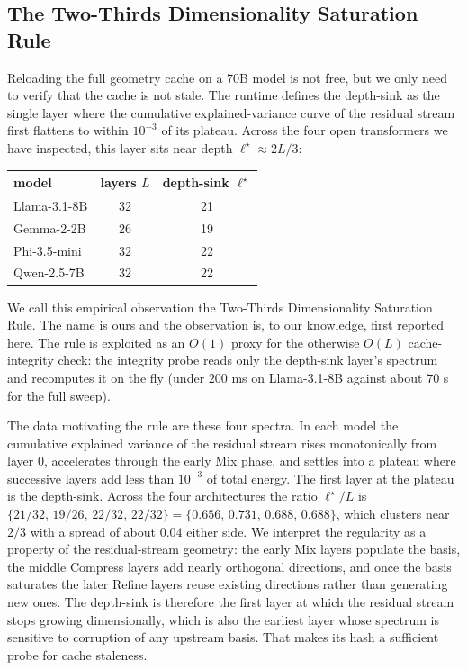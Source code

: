 \documentclass[11pt]{article}
\begin{document}
\subsection{The Two-Thirds Dimensionality Saturation Rule}
Reloading the full geometry cache on a 70B model is not free, but we
only need to verify that the cache is not stale. The runtime defines
the depth-sink as the single layer where the cumulative
explained-variance curve of the residual stream first flattens to
within $10^{-3}$ of its plateau. Across the four open transformers we
have inspected, this layer sits near depth $\ell^\star\approx 2L/3$:
\begin{center}\small
\begin{tabular}{lcc}\toprule
model & layers $L$ & depth-sink $\ell^\star$\\\midrule
Llama-3.1-8B   & 32 & 21\\
Gemma-2-2B     & 26 & 19\\
Phi-3.5-mini   & 32 & 22\\
Qwen-2.5-7B    & 32 & 22\\\bottomrule
\end{tabular}\end{center}
We call this empirical observation the Two-Thirds Dimensionality
Saturation Rule. The name is ours and the observation is, to our knowledge,
first reported here. The rule is exploited as an $O(1)$ proxy for the
otherwise $O(L)$ cache-integrity check: the integrity probe reads only the
depth-sink layer's spectrum and recomputes it on the fly (under $200$ ms on
Llama-3.1-8B against about $70$ s for the full sweep).

The data motivating the rule are these four spectra. In each model the
cumulative explained variance of the residual stream rises monotonically
from layer $0$, accelerates through the early Mix phase, and settles
into a plateau where successive layers add less than $10^{-3}$ of
total energy. The first layer at the plateau is the depth-sink. Across
the four architectures the ratio $\ell^\star/L$ is
$\{21/32,\,19/26,\,22/32,\,22/32\}=\{0.656,\,0.731,\,0.688,\,0.688\}$,
which clusters near $2/3$ with a spread of about $0.04$ either side.
We interpret the regularity as a property of the residual-stream
geometry: the early Mix layers populate the basis, the middle Compress
layers add nearly orthogonal directions, and once the basis saturates
the later Refine layers reuse existing directions rather than
generating new ones. The depth-sink is therefore the first layer at
which the residual stream stops growing dimensionally, which is also
the earliest layer whose spectrum is sensitive to corruption of any
upstream basis. That makes its hash a sufficient probe for cache
staleness.
\end{document}
